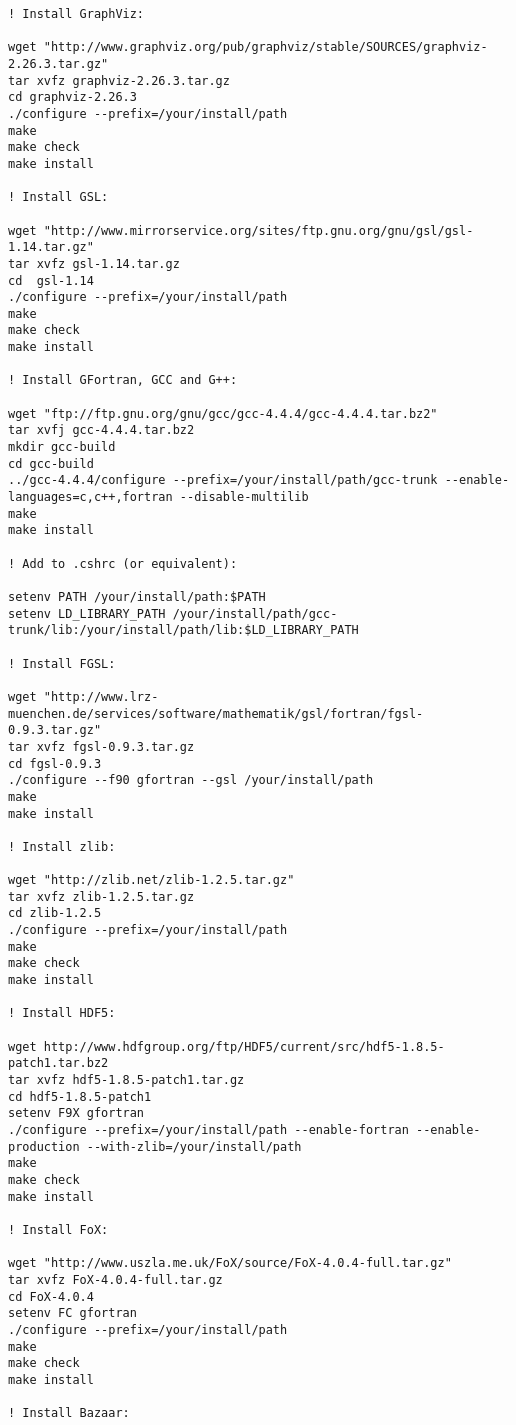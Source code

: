 \begin{lstlisting}[language=simple,stringstyle=\ttfamily,commentstyle=\itshape]
! Install GraphViz:

wget "http://www.graphviz.org/pub/graphviz/stable/SOURCES/graphviz-2.26.3.tar.gz"
tar xvfz graphviz-2.26.3.tar.gz
cd graphviz-2.26.3
./configure --prefix=/your/install/path
make
make check
make install

! Install GSL:

wget "http://www.mirrorservice.org/sites/ftp.gnu.org/gnu/gsl/gsl-1.14.tar.gz"
tar xvfz gsl-1.14.tar.gz
cd  gsl-1.14
./configure --prefix=/your/install/path
make
make check
make install

! Install GFortran, GCC and G++:

wget "ftp://ftp.gnu.org/gnu/gcc/gcc-4.4.4/gcc-4.4.4.tar.bz2"
tar xvfj gcc-4.4.4.tar.bz2
mkdir gcc-build
cd gcc-build
../gcc-4.4.4/configure --prefix=/your/install/path/gcc-trunk --enable-languages=c,c++,fortran --disable-multilib
make
make install

! Add to .cshrc (or equivalent):

setenv PATH /your/install/path:$PATH                                                                                           
setenv LD_LIBRARY_PATH /your/install/path/gcc-trunk/lib:/your/install/path/lib:$LD_LIBRARY_PATH                                                                     

! Install FGSL:

wget "http://www.lrz-muenchen.de/services/software/mathematik/gsl/fortran/fgsl-0.9.3.tar.gz"
tar xvfz fgsl-0.9.3.tar.gz
cd fgsl-0.9.3
./configure --f90 gfortran --gsl /your/install/path
make
make install

! Install zlib:

wget "http://zlib.net/zlib-1.2.5.tar.gz"
tar xvfz zlib-1.2.5.tar.gz
cd zlib-1.2.5
./configure --prefix=/your/install/path
make
make check
make install

! Install HDF5:

wget http://www.hdfgroup.org/ftp/HDF5/current/src/hdf5-1.8.5-patch1.tar.bz2
tar xvfz hdf5-1.8.5-patch1.tar.gz
cd hdf5-1.8.5-patch1
setenv F9X gfortran
./configure --prefix=/your/install/path --enable-fortran --enable-production --with-zlib=/your/install/path
make
make check
make install

! Install FoX:

wget "http://www.uszla.me.uk/FoX/source/FoX-4.0.4-full.tar.gz"
tar xvfz FoX-4.0.4-full.tar.gz
cd FoX-4.0.4
setenv FC gfortran
./configure --prefix=/your/install/path
make
make check
make install

! Install Bazaar:


\end{lstlisting}
